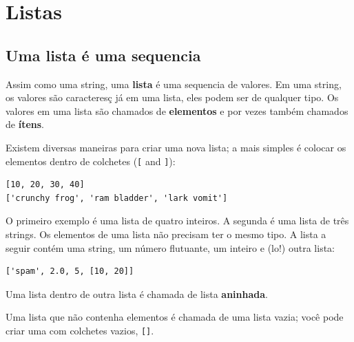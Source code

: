 
\chapter{Listas}



\section{Uma lista é uma sequencia}

Assim como uma string, uma {\bf lista} é uma sequencia de valores. Em
uma string, os valores são caracteresç já em uma lista, eles podem ser
de qualquer tipo. Os valores em uma lista são chamados de {\bf elementos}
e por vezes também chamados de {\bf ítens}.



Existem diversas maneiras para criar uma nova lista; a mais simples
é colocar os elementos dentro de colchetes (\verb"[" and \verb"]"):
 

\beforeverb
\begin{verbatim}
[10, 20, 30, 40]
['crunchy frog', 'ram bladder', 'lark vomit']
\end{verbatim}
\afterverb
%
O primeiro exemplo é uma lista de quatro inteiros. A segunda é uma lista
de três strings. Os elementos de uma lista não precisam ter o mesmo tipo.
A lista a seguir contém uma string, um número flutuante, um inteiro e (lo!)
outra lista:

\beforeverb
\begin{verbatim}
['spam', 2.0, 5, [10, 20]]
\end{verbatim}
\afterverb
%
Uma lista dentro de outra lista é chamada de lista {\bf aninhada}.


Uma lista que não contenha elementos
é chamada de uma lista vazia; você pode criar uma com 
colchetes vazios, \verb"[]".

